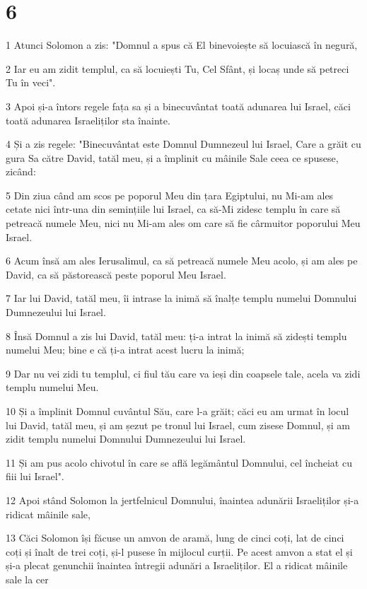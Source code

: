 \chapter{6}

\par 1 Atunci Solomon a zis: "Domnul a spus că El binevoiește să locuiască în negură,
\par 2 Iar eu am zidit templul, ca să locuiești Tu, Cel Sfânt, și locaș unde să petreci Tu în veci".
\par 3 Apoi și-a întors regele fața sa și a binecuvântat toată adunarea lui Israel, căci toată adunarea Israeliților sta înainte.
\par 4 Și a zis regele: "Binecuvântat este Domnul Dumnezeul lui Israel, Care a grăit cu gura Sa către David, tatăl meu, și a împlinit cu mâinile Sale ceea ce spusese, zicând:
\par 5 Din ziua când am scos pe poporul Meu din țara Egiptului, nu Mi-am ales cetate nici într-una din semințiile lui Israel, ca să-Mi zidesc templu în care să petreacă numele Meu, nici nu Mi-am ales om care să fie cârmuitor poporului Meu Israel.
\par 6 Acum însă am ales Ierusalimul, ca să petreacă numele Meu acolo, și am ales pe David, ca să păstorească peste poporul Meu Israel.
\par 7 Iar lui David, tatăl meu, îi intrase la inimă să înalțe templu numelui Domnului Dumnezeului lui Israel.
\par 8 Însă Domnul a zis lui David, tatăl meu: ți-a intrat la inimă să zidești templu numelui Meu; bine e că ți-a intrat acest lucru la inimă;
\par 9 Dar nu vei zidi tu templul, ci fiul tău care va ieși din coapsele tale, acela va zidi templu numelui Meu.
\par 10 Și a împlinit Domnul cuvântul Său, care l-a grăit; căci eu am urmat în locul lui David, tatăl meu, și am șezut pe tronul lui Israel, cum zisese Domnul, și am zidit templu numelui Domnului Dumnezeului lui Israel.
\par 11 Și am pus acolo chivotul în care se află legământul Domnului, cel încheiat cu fiii lui Israel".
\par 12 Apoi stând Solomon la jertfelnicul Domnului, înaintea adunării Israeliților și-a ridicat mâinile sale,
\par 13 Căci Solomon își făcuse un amvon de aramă, lung de cinci coți, lat de cinci coți și înalt de trei coți, și-l pusese în mijlocul curții. Pe acest amvon a stat el și și-a plecat genunchii înaintea întregii adunări a Israeliților. El a ridicat mâinile sale la cer
